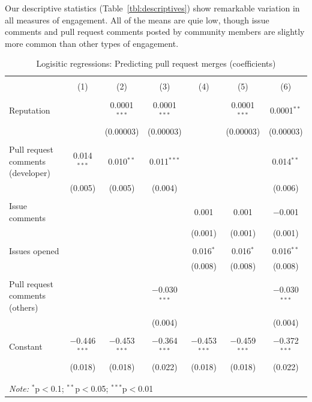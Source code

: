 \documentclass{sigchi}
\begin{document}
Our descriptive statistics (Table~\ref{tbl:descriptives}) show remarkable 
variation in all measures of engagement. All of the means are quie low, though 
issue comments and pull request comments posted by community members are 
slightly more common than other types of engagement.

\begin{table}[!htbp] \centering 
  \caption{Logisitic regressions: Predicting pull request merges (coefficients)} 
  \label{tbl:logit_coef} 
\begin{tabular}{@{\extracolsep{5pt}}lcccccc} 
\\[-1.8ex]\hline  
\\[-1.8ex] & (1) & (2) & (3) & (4) & (5) & (6)\\ 
\hline \\[-1.8ex] 
 Reputation &  & 0.0001$^{***}$ & 0.0001$^{***}$ &  & 0.0001$^{***}$ & 0.0001$^{**}$ \\ 
  &  & (0.00003) & (0.00003) &  & (0.00003) & (0.00003) \\ 
  & & & & & & \\ 
 Pull request comments (developer) & 0.014$^{***}$ & 0.010$^{**}$ & 0.011$^{***}$ &  &  & 0.014$^{**}$ \\ 
  & (0.005) & (0.005) & (0.004) &  &  & (0.006) \\ 
  & & & & & & \\ 
 Issue comments &  &  &  & 0.001 & 0.001 & $-$0.001 \\ 
  &  &  &  & (0.001) & (0.001) & (0.001) \\ 
  & & & & & & \\ 
 Issues opened &  &  &  & 0.016$^{*}$ & 0.016$^{*}$ & 0.016$^{**}$ \\ 
  &  &  &  & (0.008) & (0.008) & (0.008) \\ 
  & & & & & & \\ 
 Pull request comments (others) &  &  & $-$0.030$^{***}$ &  &  & $-$0.030$^{***}$ \\ 
   &  &  & (0.004) &  &  & (0.004) \\ 
   & & & & & & \\
 Constant & $-$0.446$^{***}$ & $-$0.453$^{***}$ & $-$0.364$^{***}$ & $-$0.453$^{***}$ & $-$0.459$^{***}$ & $-$0.372$^{***}$ \\ 
  & (0.018) & (0.018) & (0.022) & (0.018) & (0.018) & (0.022) \\ 
  & & & & & & \\ 
\hline \\[-1.8ex]  
\multicolumn{7}{l}{\textit{Note:} $^{*}$p$<$0.1; $^{**}$p$<$0.05; $^{***}$p$<$0.01} \\ 
\end{tabular} 
\end{table}
\end{document}
